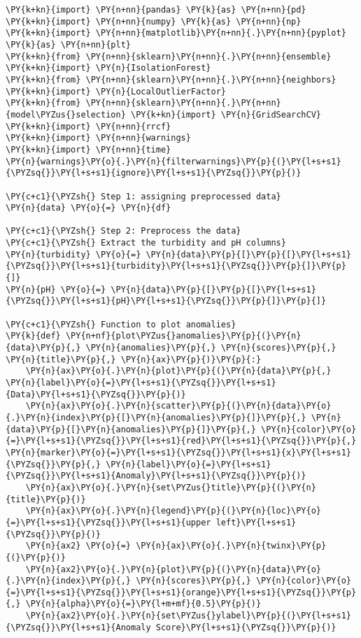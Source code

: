     \begin{tcolorbox}[breakable, size=fbox, boxrule=1pt, pad at break*=1mm,colback=cellbackground, colframe=cellborder]
\begin{Verbatim}[commandchars=\\\{\}]
\PY{k+kn}{import} \PY{n+nn}{pandas} \PY{k}{as} \PY{n+nn}{pd}
\PY{k+kn}{import} \PY{n+nn}{numpy} \PY{k}{as} \PY{n+nn}{np}
\PY{k+kn}{import} \PY{n+nn}{matplotlib}\PY{n+nn}{.}\PY{n+nn}{pyplot} \PY{k}{as} \PY{n+nn}{plt}
\PY{k+kn}{from} \PY{n+nn}{sklearn}\PY{n+nn}{.}\PY{n+nn}{ensemble} \PY{k+kn}{import} \PY{n}{IsolationForest}
\PY{k+kn}{from} \PY{n+nn}{sklearn}\PY{n+nn}{.}\PY{n+nn}{neighbors} \PY{k+kn}{import} \PY{n}{LocalOutlierFactor}
\PY{k+kn}{from} \PY{n+nn}{sklearn}\PY{n+nn}{.}\PY{n+nn}{model\PYZus{}selection} \PY{k+kn}{import} \PY{n}{GridSearchCV}
\PY{k+kn}{import} \PY{n+nn}{rrcf}
\PY{k+kn}{import} \PY{n+nn}{warnings}
\PY{k+kn}{import} \PY{n+nn}{time}
\PY{n}{warnings}\PY{o}{.}\PY{n}{filterwarnings}\PY{p}{(}\PY{l+s+s1}{\PYZsq{}}\PY{l+s+s1}{ignore}\PY{l+s+s1}{\PYZsq{}}\PY{p}{)}

\PY{c+c1}{\PYZsh{} Step 1: assigning preprocessed data}
\PY{n}{data} \PY{o}{=} \PY{n}{df}

\PY{c+c1}{\PYZsh{} Step 2: Preprocess the data}
\PY{c+c1}{\PYZsh{} Extract the turbidity and pH columns}
\PY{n}{turbidity} \PY{o}{=} \PY{n}{data}\PY{p}{[}\PY{p}{[}\PY{l+s+s1}{\PYZsq{}}\PY{l+s+s1}{turbidity}\PY{l+s+s1}{\PYZsq{}}\PY{p}{]}\PY{p}{]}
\PY{n}{pH} \PY{o}{=} \PY{n}{data}\PY{p}{[}\PY{p}{[}\PY{l+s+s1}{\PYZsq{}}\PY{l+s+s1}{pH}\PY{l+s+s1}{\PYZsq{}}\PY{p}{]}\PY{p}{]}

\PY{c+c1}{\PYZsh{} Function to plot anomalies}
\PY{k}{def} \PY{n+nf}{plot\PYZus{}anomalies}\PY{p}{(}\PY{n}{data}\PY{p}{,} \PY{n}{anomalies}\PY{p}{,} \PY{n}{scores}\PY{p}{,} \PY{n}{title}\PY{p}{,} \PY{n}{ax}\PY{p}{)}\PY{p}{:}
    \PY{n}{ax}\PY{o}{.}\PY{n}{plot}\PY{p}{(}\PY{n}{data}\PY{p}{,} \PY{n}{label}\PY{o}{=}\PY{l+s+s1}{\PYZsq{}}\PY{l+s+s1}{Data}\PY{l+s+s1}{\PYZsq{}}\PY{p}{)}
    \PY{n}{ax}\PY{o}{.}\PY{n}{scatter}\PY{p}{(}\PY{n}{data}\PY{o}{.}\PY{n}{index}\PY{p}{[}\PY{n}{anomalies}\PY{p}{]}\PY{p}{,} \PY{n}{data}\PY{p}{[}\PY{n}{anomalies}\PY{p}{]}\PY{p}{,} \PY{n}{color}\PY{o}{=}\PY{l+s+s1}{\PYZsq{}}\PY{l+s+s1}{red}\PY{l+s+s1}{\PYZsq{}}\PY{p}{,} \PY{n}{marker}\PY{o}{=}\PY{l+s+s1}{\PYZsq{}}\PY{l+s+s1}{x}\PY{l+s+s1}{\PYZsq{}}\PY{p}{,} \PY{n}{label}\PY{o}{=}\PY{l+s+s1}{\PYZsq{}}\PY{l+s+s1}{Anomaly}\PY{l+s+s1}{\PYZsq{}}\PY{p}{)}
    \PY{n}{ax}\PY{o}{.}\PY{n}{set\PYZus{}title}\PY{p}{(}\PY{n}{title}\PY{p}{)}
    \PY{n}{ax}\PY{o}{.}\PY{n}{legend}\PY{p}{(}\PY{n}{loc}\PY{o}{=}\PY{l+s+s1}{\PYZsq{}}\PY{l+s+s1}{upper left}\PY{l+s+s1}{\PYZsq{}}\PY{p}{)}
    \PY{n}{ax2} \PY{o}{=} \PY{n}{ax}\PY{o}{.}\PY{n}{twinx}\PY{p}{(}\PY{p}{)}
    \PY{n}{ax2}\PY{o}{.}\PY{n}{plot}\PY{p}{(}\PY{n}{data}\PY{o}{.}\PY{n}{index}\PY{p}{,} \PY{n}{scores}\PY{p}{,} \PY{n}{color}\PY{o}{=}\PY{l+s+s1}{\PYZsq{}}\PY{l+s+s1}{orange}\PY{l+s+s1}{\PYZsq{}}\PY{p}{,} \PY{n}{alpha}\PY{o}{=}\PY{l+m+mf}{0.5}\PY{p}{)}
    \PY{n}{ax2}\PY{o}{.}\PY{n}{set\PYZus{}ylabel}\PY{p}{(}\PY{l+s+s1}{\PYZsq{}}\PY{l+s+s1}{Anomaly Score}\PY{l+s+s1}{\PYZsq{}}\PY{p}{)}


\end{Verbatim}
\end{tcolorbox}
